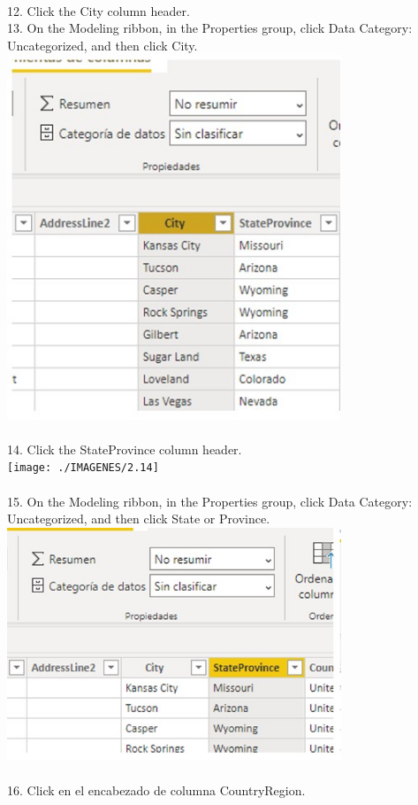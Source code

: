 \documentclass[preprint,12pt]{elsarticle}
\begin{document}
\begin{itemize}
		 		\\ 12. Click the City column header.
		 		\\ 13. On the Modeling ribbon, in the Properties group, click Data Category: Uncategorized, and then click City.
		 		\\ \includegraphics[width=10cm]{./IMAGENES/2.13} \\
		 		\\ 14. Click the StateProvince column header.
		 		\\ \texttt{[image: ./IMAGENES/2.14]} \\
		 		\\ 15. On the Modeling ribbon, in the Properties group, click Data Category: Uncategorized, and then click State or
		 		Province.
		 		\\ \includegraphics[width=10cm]{./IMAGENES/2.15} \\
		 		\\ 16. Click en el encabezado de columna CountryRegion.

\end{itemize}
\end{document}
